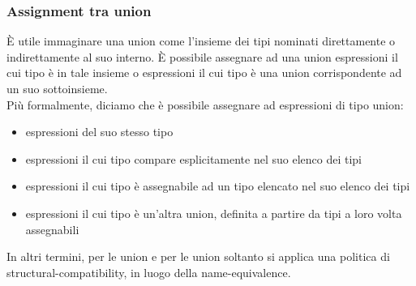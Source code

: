 \subsubsection{Assignment tra union}
È utile immaginare una union come l'insieme dei tipi nominati direttamente
o indirettamente al suo interno. È possibile assegnare ad una union espressioni il cui tipo è
in tale insieme o espressioni il cui tipo è una union corrispondente ad un suo sottoinsieme. \\

Più formalmente, diciamo che è possibile assegnare ad espressioni di tipo union:
\begin{itemize}
    \item espressioni del suo stesso tipo
    \item espressioni il cui tipo compare esplicitamente nel suo elenco dei tipi
    \item espressioni il cui tipo è assegnabile ad un tipo elencato nel suo elenco dei tipi
    \item espressioni il cui tipo è un’altra union, definita a partire da tipi a loro volta assegnabili
\end{itemize} 

\vspace{0.4cm}

In altri termini, per le union e per le union soltanto si applica una politica di structural-compatibility,
in luogo della name-equivalence.
\vspace{0.4cm}